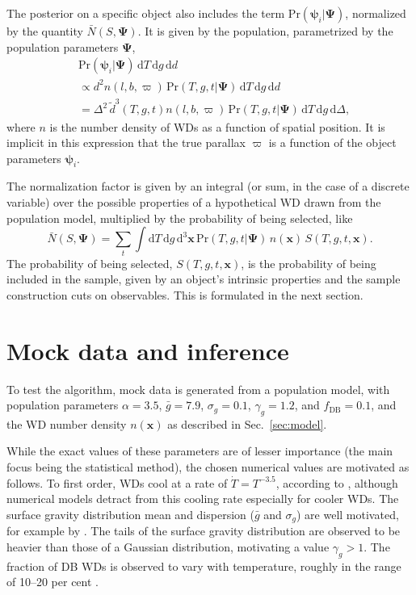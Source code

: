 \documentclass[fleqn,usenatbib]{mnras}
\newcommand{\popp}{\boldsymbol{\Psi}}
\newcommand{\objp}{\boldsymbol{\psi}}
\newcommand{\Teff}{T}
\newcommand{\logg}{g}
\newcommand{\pr}{\text{Pr}}
\newcommand{\de}{\text{d}}
\begin{document}
The posterior on a specific object also includes the term $\pr(\objp_i | \popp)$, normalized by the quantity $\bar{N}(S,\popp)$. It is given by the population, parametrized by the population parameters $\popp$,
\begin{equation}
\begin{split}
	& \pr(\objp_i | \popp)\, \de \Teff\, \de \logg\, \de d  \\ & \propto
    d^2 n(l,b,\varpi)\, \pr(\Teff,g,t | \popp)\, \de \Teff\, \de \logg\, \de d \\
    & = \Delta^2\, \tilde{d}^3(\Teff,\logg,t) n(l,b,\varpi)\, \pr(\Teff,g,t | \popp)\, \de \Teff\, \de\logg\, \de \Delta,
\end{split}
\end{equation}
where $n$ is the number density of WDs as a function of spatial position. It is implicit in this expression that the true parallax $\varpi$ is a function of the object parameters $\objp_i$.

The normalization factor is given by an integral (or sum, in the case of a discrete variable) over the possible properties of a hypothetical WD drawn from the population model, multiplied by the probability of being selected, like
\begin{equation}\label{eq:normalization}
	\bar{N}(S,\popp) = \sum_{t} \int \de\Teff\, \de \logg\, \de^3\mathbf{x}\,
    \pr(\Teff,g,t | \popp)\, n(\mathbf{x})\, S(\Teff,\logg,t,\mathbf{x}).
\end{equation}
The probability of being selected, $S(\Teff,\logg,t,\mathbf{x})$, is the probability of being included in the sample, given by an object's intrinsic properties and the sample construction cuts on observables. This is formulated in  the next section.







\section{Mock data and inference}\label{sec:mock}

To test the algorithm, mock data is generated from a population model, with population parameters $\alpha=3.5$, $\bar{g}=7.9$, $\sigma_g=0.1$, $\gamma_g=1.2$, and $f_\text{DB}=0.1$, and the WD number density $n(\mathbf{x})$ as described in Sec.~\ref{sec:model}.

While the exact values of these parameters are of lesser importance (the main focus being the statistical method), the chosen numerical values are motivated as follows. To first order, WDs cool at a rate of $\dot{\Teff} = \Teff^{-3.5}$, according to \cite{1952MNRAS.112..583M}, although numerical models detract from this cooling rate especially for cooler WDs. The surface gravity distribution mean and dispersion ($\bar{g}$ and $\sigma_g$) are well motivated, for example by \cite{2006ApJS..167...40E}. The tails of the surface gravity distribution are observed to be heavier than those of a Gaussian distribution, motivating a value $\gamma_g>1$. The fraction of DB WDs is observed to vary with temperature, roughly in the range of 10--20 per cent \citep{2011ApJ...737...28B}.
\end{document}
